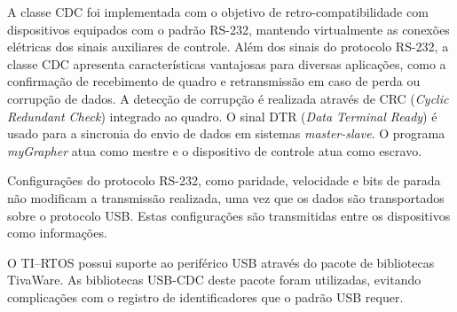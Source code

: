 			A classe CDC foi implementada com o objetivo de retro-compatibilidade com dispositivos equipados com o padrão RS-232, mantendo virtualmente as conexões elétricas dos sinais auxiliares de controle. Além dos sinais do protocolo RS-232, a classe CDC apresenta características vantajosas para diversas aplicações, como a confirmação de recebimento de quadro e retransmissão em caso de perda ou corrupção de dados. A detecção de corrupção é realizada através de CRC (\textit{Cyclic Redundant Check}) integrado ao quadro. O sinal DTR (\textit{Data Terminal Ready}) é usado para a sincronia do envio de dados em sistemas \textit{master-slave}. O programa \textit{myGrapher} atua como mestre e o dispositivo de controle atua como escravo.

			Configurações do protocolo RS-232, como paridade, velocidade e bits de parada não modificam a transmissão realizada, uma vez que os dados são transportados sobre o protocolo USB. Estas configurações são transmitidas entre os dispositivos como informações.

			O TI--RTOS possui suporte ao periférico USB através do pacote de bibliotecas TivaWare. As bibliotecas USB-CDC deste pacote foram utilizadas, evitando complicações com o registro de identificadores que o padrão USB requer.
